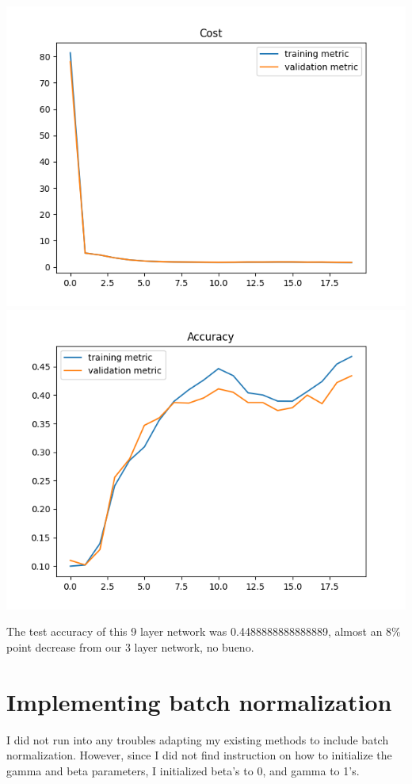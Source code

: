 \documentclass[11pt,a4paper]{article}
\begin{document}
\includegraphics[width=\textwidth]{cost_k=9.png}
\includegraphics[width=\textwidth]{accuracy_k=9.png}

The test accuracy of this 9 layer network was 0.4488888888888889, almost an 8\% point decrease from our 3 layer network, no bueno.

\section{Implementing batch normalization}

I did not run into any troubles adapting my existing methods to include batch normalization. However, since I did not find instruction on how to initialize the gamma and beta parameters, I initialized beta's to 0, and gamma to 1's.\\
\end{document}
